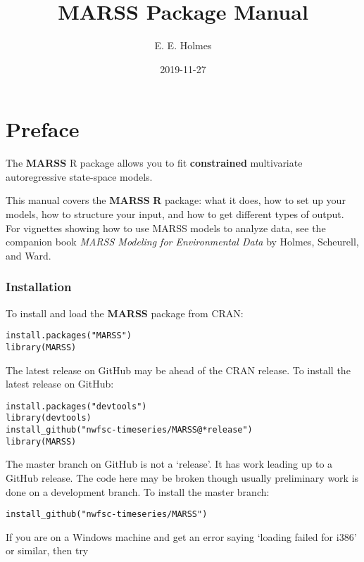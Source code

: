 \documentclass[12pt,]{book}
\title{MARSS Package Manual}
\author{E. E. Holmes}
\date{2019-11-27}
\begin{document}
\maketitle

{
\setcounter{tocdepth}{1}
\tableofcontents
}
\hypertarget{preface}{%
\chapter*{Preface}\label{preface}}


The \textbf{MARSS} R package allows you to fit \textbf{constrained} multivariate autoregressive state-space models.

This manual covers the \textbf{MARSS} \textbf{R} package: what it does, how to set up your models, how to structure your input, and how to get different types of output. For vignettes showing how to use MARSS models to analyze data, see the companion book \emph{MARSS Modeling for Environmental Data} by Holmes, Scheurell, and Ward.

\hypertarget{installation}{%
\subsection*{Installation}\label{installation}}


To install and load the \textbf{MARSS} package from CRAN:

\begin{verbatim}
install.packages("MARSS")
library(MARSS)
\end{verbatim}

The latest release on GitHub may be ahead of the CRAN release. To install the latest release on GitHub:

\begin{verbatim}
install.packages("devtools")
library(devtools)
install_github("nwfsc-timeseries/MARSS@*release")
library(MARSS)
\end{verbatim}

The master branch on GitHub is not a `release'. It has work leading up to a GitHub release. The code here may be broken though usually preliminary work is done on a development branch. To install the master branch:

\begin{verbatim}
install_github("nwfsc-timeseries/MARSS")
\end{verbatim}

If you are on a Windows machine and get an error saying `loading failed for i386' or similar, then try
\end{document}
